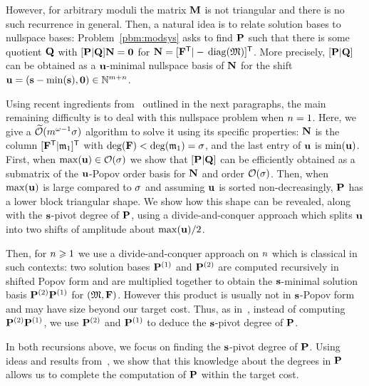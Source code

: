 \documentclass[preprint]{sig-alternate-05-2015}
\begin{document}
However, for arbitrary moduli the matrix $\mulmat$ is not triangular and there
is no such recurrence in general. Then, a natural idea is to relate solution
bases to nullspace bases: Problem~\ref{pbm:modsys} asks to find $\msb$ such
that there is some quotient $\mat{Q}$ with $[\msb | \mat{Q}] \mat{N} = \mat{0}$
for $\mat{N} = \trsp{[\trsp{\sys} | -\diag{\Modulus}]}$.  More precisely,
$[\msb | \mat{Q}]$ can be obtained as a $\shifts[u]$-minimal nullspace basis of
$\mat{N}$ for the shift $\shifts[u] = (\shifts-\min(\shifts),\unishift) \in
\NN^{\nbun+\nbeq}$.

Using recent ingredients from~\cite{GupSto11,JeNeScVi16} outlined in the next
paragraphs, the main remaining difficulty is to deal with this nullspace
problem when $\nbeq = 1$. Here, we give a $\softO{\nbun^{\expmatmul-1}
\degMod}$ algorithm to solve it using its specific properties: $\mat{N}$ is the
column $\trsp{[\trsp{\sys}|\modulus_1]}$ with $\deg(\sys) < \deg(\modulus_1) =
\degMod$, and the last entry of $\shifts[u]$ is $\min(\shifts[u])$. First, when
$\max(\shifts[u]) \in \bigO{\degMod}$ we show that $[\msb | \mat{Q}]$ can be
efficiently obtained as a submatrix of the $\shifts[u]$-Popov order basis for
$\mat{N}$ and order $\bigO{\degMod}$. Then, when $\max(\shifts[u])$ is large
compared to $\degMod$ and assuming $\shifts[u]$ is sorted non-decreasingly,
$\msb$ has a lower block triangular shape. We show how this shape can be
revealed, along with the $\shifts$-pivot degree of $\msb$, using a
divide-and-conquer approach which splits $\shifts[u]$ into two shifts of
amplitude about $\max(\shifts[u])/2$.

Then, for $\nbeq\ge 1$ we use a divide-and-conquer approach on $\nbeq$ which is
classical in such contexts: two solution bases $\msb^{(1)}$ and $\msb^{(2)}$
are computed recursively in shifted Popov form and are multiplied together to
obtain the $\shifts$-minimal solution basis $\msb^{(2)} \msb^{(1)}$ for
$(\Modulus,\sys)$. However this product is usually not in $\shifts$-Popov form
and may have size beyond our target cost. Thus, as in~\cite{JeNeScVi16},
instead of computing $\msb^{(2)} \msb^{(1)}$, we use $\msb^{(2)}$ and
$\msb^{(1)}$ to deduce the $\shifts$-pivot degree of $\msb$.

In both recursions above, we focus on finding the $\shifts$-pivot degree of
$\msb$. Using ideas and results from~\cite{GupSto11,JeNeScVi16}, we show that
this knowledge about the degrees in $\msb$ allows us to complete the
computation of $\msb$ within the target cost.
\end{document}

